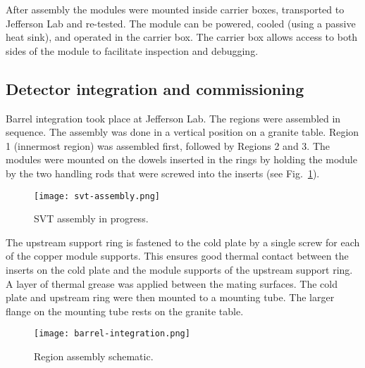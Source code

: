 After assembly the modules were mounted inside carrier boxes, transported to Jefferson Lab and re-tested. The module can be powered, cooled (using a passive heat sink), and operated in the carrier box. The carrier box allows access to both sides of the module to facilitate inspection and debugging.

\subsection{Detector integration and commissioning}

Barrel integration took place at Jefferson Lab. The regions were assembled in sequence. The assembly was done in a vertical position on a granite table. Region 1 (innermost region) was assembled first, followed by Regions 2 and 3. The modules were mounted on the dowels inserted in the rings by holding the module by the two handling rods that were screwed into the inserts (see Fig.~\ref{fig:svt-assembly}). 

\begin{figure}[hbt] 
\centering 
\texttt{[image: svt-assembly.png]}
\caption{SVT assembly in progress.}
\label{fig:svt-assembly}
\end{figure}

The upstream support ring is fastened to the cold plate by a single screw for each of the copper module supports. This ensures good thermal contact between the inserts on the cold plate and the module supports of the upstream support ring. A layer of thermal grease was applied between the mating surfaces. The cold plate and upstream ring were then mounted to a mounting tube. The larger flange on the mounting tube rests on the granite table. 

\begin{figure}[hbt] 
\centering 
\texttt{[image: barrel-integration.png]}
\caption{Region assembly schematic.}
\label{fig:barrel-integration}
\end{figure}

